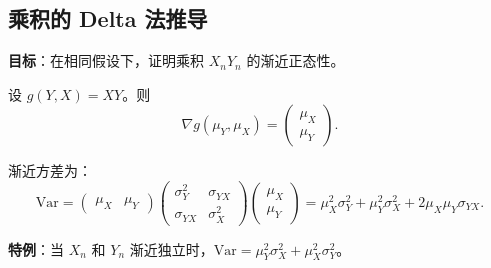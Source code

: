 \subsection{乘积的 Delta 法推导}\label{sec:appendix-product-delta-method}

\textbf{目标}：在相同假设下，证明乘积 $X_n Y_n$ 的渐近正态性。

设 $g(Y, X) = XY$。则
\[
\nabla g(\mu_Y, \mu_X) = \begin{pmatrix} \mu_X \\ \mu_Y \end{pmatrix}.
\]

渐近方差为：
\[
\text{Var} = \begin{pmatrix} \mu_X & \mu_Y \end{pmatrix}
\begin{pmatrix} \sigma_Y^2 & \sigma_{YX} \\ \sigma_{YX} & \sigma_X^2 \end{pmatrix}
\begin{pmatrix} \mu_X \\ \mu_Y \end{pmatrix}
= \mu_X^2 \sigma_Y^2 + \mu_Y^2 \sigma_X^2 + 2\mu_X \mu_Y \sigma_{YX}.
\]

\textbf{特例}：当 $X_n$ 和 $Y_n$ 渐近独立时，$\text{Var} = \mu_Y^2 \sigma_X^2 + \mu_X^2 \sigma_Y^2$。
